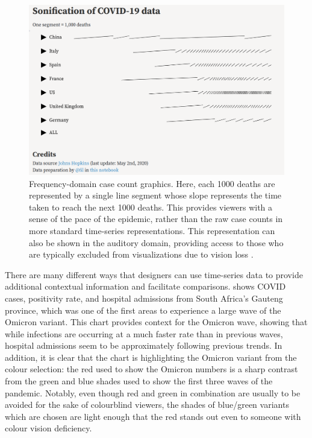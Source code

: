 \documentclass[article]{jdssv}\usepackage[]{graphicx}\usepackage[]{xcolor}
\begin{document}
\begin{figure}
\centering
\includegraphics[width=.75\linewidth]{frequency-domain}
\caption{Frequency-domain case count graphics. Here, each 1000 deaths are represented by a single line segment whose slope represents the time taken to reach the next 1000 deaths. This provides viewers with a sense of the pace of the epidemic, rather than the raw case counts in more standard time-series representations. This representation can also be shown in the auditory domain, providing access to those who are typically excluded from visualizations due to vision loss \citep{vuillemotSonificationCOVID19Data2020}.}
\label{fig:freq-domain}
\end{figure}

There are many different ways that designers can use time-series data to provide additional contextual information and facilitate comparisons.  shows COVID cases, positivity rate, and hospital admissions from South Africa's Gauteng province, which was one of the first areas to experience a large wave of the Omicron variant. This chart provides context for the Omicron wave, showing that while infections are occurring at a much faster rate than in previous waves, hospital admissions seem to be approximately following previous trends. In addition, it is clear that the chart is highlighting the Omicron variant from the colour selection: the red used to show the Omicron numbers is a sharp contrast from the green and blue shades used to show the first three waves of the pandemic. Notably, even though red and green in combination are usually to be avoided for the sake of colourblind viewers, the shades of blue/green variants which are chosen are light enough that the red stands out even to someone with colour vision deficiency.
\end{document}
